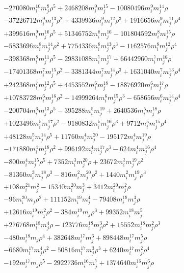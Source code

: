 {\begin{align*}
&-270080m_i^{10}m_j^{9}\rho^{5}+2468208m_i^{9}m_j^{15}-10080496m_i^{9}m_j^{14}\rho\\
&-37226712m_i^{9}m_j^{13}\rho^{2}+4339936m_i^{9}m_j^{12}\rho^{3}+1916656m_i^{9}m_j^{11}\rho^{4}\\
&+399616m_i^{9}m_j^{10}\rho^{5}+51346752m_i^{8}m_j^{16}-101804592m_i^{8}m_j^{15}\rho\\
&-5833696m_i^{8}m_j^{14}\rho^{2}+7754336m_i^{8}m_j^{13}\rho^{3}-1162576m_i^{8}m_j^{12}\rho^{4}\\
&-398368m_i^{8}m_j^{11}\rho^{5}-29831088m_i^{7}m_j^{17}+66442960m_i^{7}m_j^{16}\rho\\
&-17401368m_i^{7}m_j^{15}\rho^{2}-3381344m_i^{7}m_j^{14}\rho^{3}+1631040m_i^{7}m_j^{13}\rho^{4}\\
&+242368m_i^{7}m_j^{12}\rho^{5}+4453552m_i^{6}m_j^{18}-18876920m_i^{6}m_j^{17}\rho\\
&+10783728m_i^{6}m_j^{16}\rho^{2}+14999264m_i^{6}m_j^{15}\rho^{3}-658656m_i^{6}m_j^{14}\rho^{4}\\
&-200704m_i^{6}m_j^{13}\rho^{5}-395288m_i^{5}m_j^{19}+2640536m_i^{5}m_j^{18}\rho\\
&+1023496m_i^{5}m_j^{17}\rho^{2}-9180832m_i^{5}m_j^{16}\rho^{3}+9712m_i^{5}m_j^{15}\rho^{4}\\
&+48128m_i^{5}m_j^{14}\rho^{5}+11760m_i^{4}m_j^{20}-195172m_i^{4}m_j^{19}\rho\\
&-171880m_i^{4}m_j^{18}\rho^{2}+996192m_i^{4}m_j^{17}\rho^{3}-624m_i^{4}m_j^{16}\rho^{4}\\
&-800m_i^{4}m_j^{15}\rho^{5}+7352m_i^{3}m_j^{20}\rho+23672m_i^{3}m_j^{19}\rho^{2}\\
&-81360m_i^{3}m_j^{18}\rho^{3}-816m_i^{2}m_j^{20}\rho^{2}+1440m_i^{2}m_j^{19}\rho^{3}\\
&+108m_i^{21}m_j^{2}-15340m_i^{20}m_j^{3}+3412m_i^{20}m_j^{2}\rho\\
&-96m_i^{20}m_j\rho^{2}+111152m_i^{19}m_j^{4}-79408m_i^{19}m_j^{3}\rho\\
&+12616m_i^{19}m_j^{2}\rho^{2}-384m_i^{19}m_j\rho^{3}+99352m_i^{18}m_j^{5}\\
&+276768m_i^{18}m_j^{4}\rho-123776m_i^{18}m_j^{3}\rho^{2}+15552m_i^{18}m_j^{2}\rho^{3}\\
&-480m_i^{18}m_j\rho^{4}+382648m_i^{17}m_j^{6}+898448m_i^{17}m_j^{5}\rho\\
&-6680m_i^{17}m_j^{4}\rho^{2}-50816m_i^{17}m_j^{3}\rho^{3}+6240m_i^{17}m_j^{2}\rho^{4}\\
&-192m_i^{17}m_j\rho^{5}-2922736m_i^{16}m_j^{7}+1374640m_i^{16}m_j^{6}\rho\\

\end{align*}}
